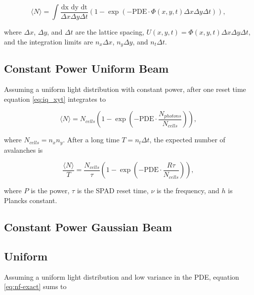 \documentclass[main.tex]{subfiles} %
\begin{document}
\begin{equation}\label{eq:iq_xyt}
    \langle N \rangle = \int \frac{\text{dx dy dt}}{\Delta x \Delta y \Delta t} \left(1-\exp{\left(-\text{PDE}\cdot \Phi(x,y,t) \Delta x \Delta y \Delta t\right)}\right),
\end{equation}

where $\Delta x$, $\Delta y$, and $\Delta t$ are the lattice spacing, $U(x,y,t) = \Phi(x,y,t) \Delta x \Delta y \Delta t$, and the integration limits are $n_x\Delta x$, $n_y\Delta y$, and $n_t\Delta t$.

\subsection{Constant Power Uniform Beam}

Assuming a uniform light distribution with constant power, after one reset time equation \ref{eq:iq_xyt} integrates to

\begin{equation}
    \langle N \rangle = N_{cells} \left( 1- \exp{\left(-\text{PDE}\cdot \frac{N_{photons}}{N_{cells}}\right)}  \right),
\end{equation}

where $N_{cells} = n_x n_y$. After a long time $T = n_t\Delta t$, the expected number of avalanches is

\begin{equation}
    \frac{\langle N \rangle}{T} = \frac{N_{cells}}{\tau} \left( 1- \exp{\left(-\text{PDE}\cdot \frac{R \tau}{N_{cells}}\right)}  \right),
\end{equation}

where $P$ is the power, $\tau$ is the SPAD reset time, $\nu$ is the frequency, and $h$ is Plancks constant.

\subsection{Constant Power Gaussian Beam}










\subsection{Uniform}


Assuming a uniform light distribution and low variance in the PDE, equation \ref{eq:nf-exact} sums to
\end{document}
